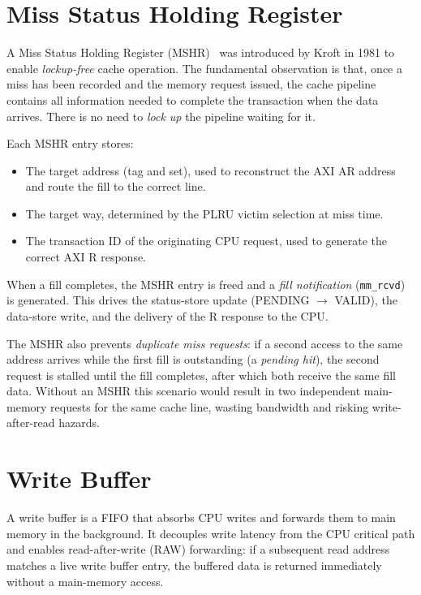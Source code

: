\documentclass[12pt,letterpaper]{report}
\begin{document}
\section{Miss Status Holding Register}

A Miss Status Holding Register (MSHR)~\cite{kroft1981} was introduced
by Kroft in 1981 to enable \emph{lockup-free} cache operation.  The
fundamental observation is that, once a miss has been recorded and the
memory request issued, the cache pipeline contains all information
needed to complete the transaction when the data arrives.  There is no
need to \emph{lock up} the pipeline waiting for it.

Each MSHR entry stores:
\begin{itemize}
  \item The target address (tag and set), used to reconstruct the AXI
        AR address and route the fill to the correct line.
  \item The target way, determined by the PLRU victim selection at
        miss time.
  \item The transaction ID of the originating CPU request, used to
        generate the correct AXI R response.
\end{itemize}

When a fill completes, the MSHR entry is freed and a \emph{fill
notification} (\texttt{mm\_rcvd}) is generated.  This drives the
status-store update (PENDING $\to$ VALID), the data-store write, and
the delivery of the R response to the CPU.

The MSHR also prevents \emph{duplicate miss requests}: if a second
access to the same address arrives while the first fill is outstanding
(a \emph{pending hit}), the second request is stalled until the fill
completes, after which both receive the same fill data.  Without an
MSHR this scenario would result in two independent main-memory requests
for the same cache line, wasting bandwidth and risking write-after-read
hazards.

\section{Write Buffer}

A write buffer is a FIFO that absorbs CPU writes and forwards them to
main memory in the background.  It decouples write latency from the CPU
critical path and enables read-after-write (RAW) forwarding: if a
subsequent read address matches a live write buffer entry, the buffered
data is returned immediately without a main-memory access.
\end{document}
